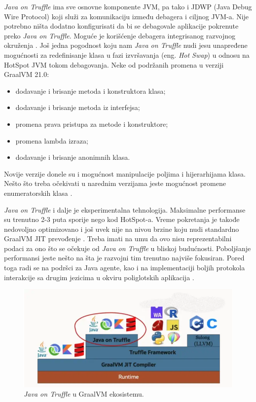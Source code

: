 \documentclass[a4paper]{article}
\begin{document}
\emph{Java on Truffle} ima sve osnovne komponente JVM, pa tako i JDWP (Java Debug Wire Protocol) koji služi za komunikaciju između debagera i ciljnog JVM-a. Nije potrebno ništa dodatno konfigurisati da bi se debagovale aplikacije pokrenute preko \emph{Java on Truffle}. Moguće je korišćenje debagera integrisanog razvojnog okruženja \cite{graalvm}. Još jedna pogodnost koju nam \emph{Java on Truffle} nudi jesu unapređene mogućnosti za redefinisanje klasa u fazi izvršavanja (eng. \emph{Hot Swap}) u odnosu na HotSpot JVM tokom debagovanja. Neke od podržanih promena u verziji GraalVM 21.0:
\begin{itemize}
    \item dodavanje i brisanje metoda i konstruktora klasa;
    \item dodavanje i brisanje metoda iz interfejsa;
    \item promena prava pristupa za metode i konstruktore;
    \item promena lambda izraza;
    \item dodavanje i brisanje anonimnih klasa.
\end{itemize}
Novije verzije donele su i mogućnost manipulacije poljima i hijerarhijama klasa. Nešto što treba očekivati u narednim verzijama jeste mogućnost promene enumeratorskih klasa \cite{graalvm}.

\emph{Java on Truffle} i dalje je eksperimentalna tehnologija. Maksimalne performanse su trenutno 2-3 puta sporije nego kod HotSpot-a. Vreme pokretanja je takođe nedovoljno optimizovano i još uvek nije na nivou brzine koju nudi standardno GraalVM JIT prevođenje \cite{graalvm}. Treba imati na umu da ovo nisu reprezentabilni podaci za ono što se očekuje od \emph{Java on Truffle} u bliskoj budućnosti. Poboljšanje performansi jeste nešto na šta je razvojni tim trenutno najviše fokusiran. Pored toga radi se na podršci za Java agente, kao i na implementaciji boljih protokola interakcije sa drugim jezicima u okviru poliglotskih aplikacija \cite{graalvm}.


\begin{figure}
	\begin{center}
	\includegraphics[scale=0.35]{imgs/java_on_truffle.png}
	\end{center}
	\caption{\emph{Java on Truffle} u GraalVM ekosistemu.}
	\label{fig:javaontruffle}
\end{figure}
\end{document}
